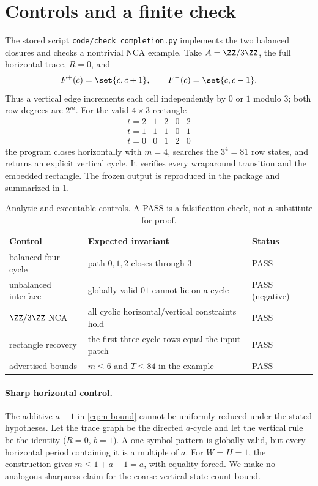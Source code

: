 \section{Controls and a finite check}\label{sec:controls}

The stored script \texttt{code/check\_completion.py} implements the two balanced closures and checks a nontrivial NCA example.  Take
$A=\ZZ/3\ZZ$, the full horizontal trace, $R=0$, and
\[
 F^+(c)=\set{c,c+1},
 \qquad
 F^-(c)=\set{c,c-1}.
\]
Thus a vertical edge increments each cell independently by $0$ or $1$ modulo $3$; both row degrees are $2^m$.  For the valid $4\times3$ rectangle
\[
 \begin{array}{c|cccc}
 t=2&1&2&0&2\\
 t=1&1&1&0&1\\
 t=0&0&1&2&0
 \end{array}
\]
the program closes horizontally with $m=4$, searches the $3^4=81$ row states, and returns an explicit vertical cycle.  It verifies every wraparound transition and the embedded rectangle.  The frozen output is reproduced in the package and summarized in \cref{tab:controls}.

\begin{table}[ht]
\centering
\caption{Analytic and executable controls.  A PASS is a falsification check, not a substitute for proof.}\label{tab:controls}
\begin{tabularx}{\textwidth}{@{}lXl@{}}
\toprule
Control & Expected invariant & Status\\
\midrule
balanced four-cycle & path $0,1,2$ closes through $3$ & PASS\\
unbalanced interface & globally valid $01$ cannot lie on a cycle & PASS (negative)\\
$\ZZ/3\ZZ$ NCA & all cyclic horizontal/vertical constraints hold & PASS\\
rectangle recovery & the first three cycle rows equal the input patch & PASS\\
advertised bounds & $m\leq6$ and $T\leq84$ in the example & PASS\\
\bottomrule
\end{tabularx}
\end{table}

\paragraph{Sharp horizontal control.}
The additive $a-1$ in \eqref{eq:m-bound} cannot be uniformly reduced under the stated hypotheses.  Let the trace graph be the directed $a$-cycle and let the vertical rule be the identity ($R=0$, $b=1$).  A one-symbol pattern is globally valid, but every horizontal period containing it is a multiple of $a$.  For $W=H=1$, the construction gives $m\leq1+a-1=a$, with equality forced.  We make no analogous sharpness claim for the coarse vertical state-count bound.

